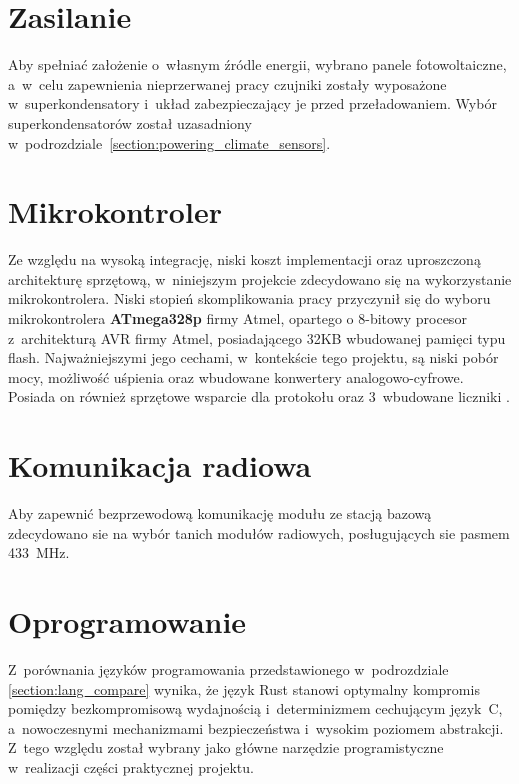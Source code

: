 \section{Zasilanie}
Aby spełniać założenie o~własnym źródle energii,
wybrano panele fotowoltaiczne, a~w~celu zapewnienia nieprzerwanej pracy 
czujniki zostały wyposażone w~superkondensatory i~układ 
zabezpieczający je przed przeładowaniem. Wybór superkondensatorów
został uzasadniony w~podrozdziale~\ref{section:powering_climate_sensors}.

\section{Mikrokontroler}
Ze względu na wysoką integrację, niski koszt 
implementacji oraz uproszczoną architekturę sprzętową, 
w~niniejszym projekcie zdecydowano się na wykorzystanie 
mikrokontrolera.
Niski stopień skomplikowania pracy przyczynił się do wyboru
mikrokontrolera \textbf{ATmega328p} firmy Atmel, opartego o 8-bitowy procesor 
z~architekturą AVR firmy Atmel, posiadającego 32KB wbudowanej pamięci 
typu flash\cite{ATmega328p}. 
Najważniejszymi jego cechami, w~kontekście tego projektu, są niski 
pobór mocy, możliwość uśpienia oraz wbudowane konwertery
analogowo-cyfrowe\cite{ATmega328p}.
Posiada on również sprzętowe wsparcie dla protokołu \isqrc{} oraz 
3~wbudowane liczniki .

\section{Komunikacja radiowa}
Aby zapewnić bezprzewodową komunikację modułu ze stacją bazową
zdecydowano sie na wybór tanich modułów radiowych, posługujących
sie pasmem \SI{433}{\mega\hertz}.

\section{Oprogramowanie}
Z~porównania języków programowania przedstawionego 
w~podrozdziale \ref{section:lang_compare} wynika,
że język Rust stanowi optymalny 
kompromis pomiędzy bezkompromisową wydajnością i~determinizmem 
cechującym język~C, a~nowoczesnymi mechanizmami bezpieczeństwa 
i~wysokim poziomem abstrakcji. Z~tego względu został wybrany 
jako główne narzędzie programistyczne w~realizacji części praktycznej
projektu.



